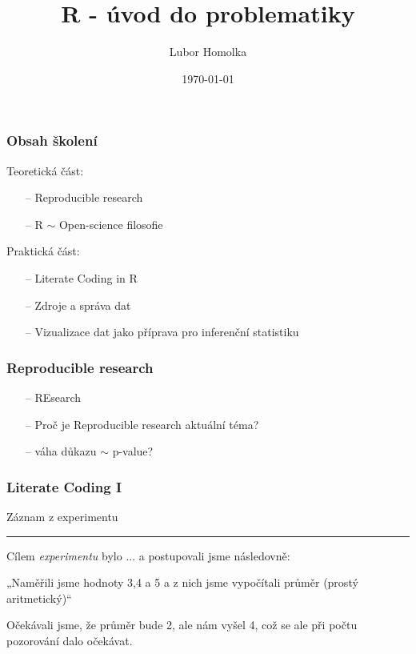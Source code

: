 \documentclass[10pt,xcolor={dvipsnames}]{beamer}
\begin{document}
\title{\textsf{R} - úvod do problematiky}
\author{Lubor Homolka}
\date{\today}
\begin{frame}
\titlepage
\end{frame}

\begin{frame}
\frametitle{Obsah školení}
\begin{large}
Teoretická část:\\
\begin{itemize}
\item[--] Reproducible research \\[0.4cm]
\item[--] R $\sim$ Open-science filosofie \\[0.5cm]
\end{itemize}
Praktická část:\\
\begin{itemize}
\item[--] Literate Coding in R \\[0.4cm]
\item[--] Zdroje a správa dat \\[0.4cm]
\item[--] Vizualizace dat jako příprava pro inferenční statistiku
\end{itemize}
\end{large}
\end{frame}



\begin{frame}[fragile]
\frametitle{Reproducible research}
\begin{Large}
\begin{itemize}
\item[--] \textcolor{WildStrawberry}{RE}\textcolor{NavyBlue}{search}
\item[--] Proč je Reproducible research aktuální téma?
\item[--] váha důkazu $\sim$ p-value?
\end{itemize}
\end{Large}

\end{frame}

\begin{frame}
\frametitle{Literate Coding I}
\Large{Záznam z experimentu}\hrule\bigskip 

Cílem \emph{experimentu} bylo ...\newline
a postupovali jsme následovně:\newline

„Naměřili jsme hodnoty 3,4 a 5 a z nich jsme vypočítali průměr (prostý aritmetický)“ \newline\smallskip

Očekávali jsme, že průměr bude 2, ale nám vyšel 4, což se ale při počtu pozorování dalo očekávat.

\end{frame}
\end{document}
